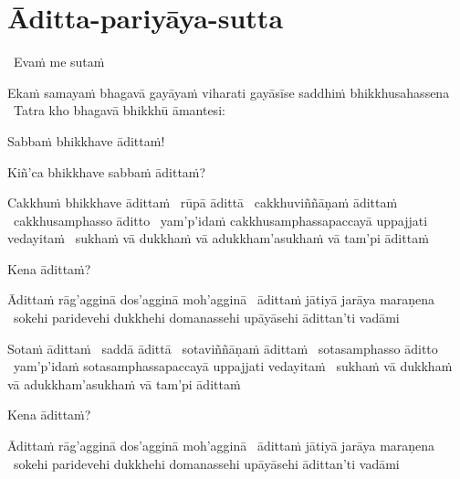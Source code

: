 \section{Āditta-pariyāya-sutta}
\label{aditta-pariyaya}

\begin{leader}
  \anglebracketleft\ \hspace{-0.5mm}Evaṁ me sutaṁ \hspace{-0.5mm}\anglebracketright\
\end{leader}

\begin{pali-hang}
  Ekaṁ samayaṁ bhagavā gayāyaṁ viharati gayāsīse saddhiṁ bhikkhusahassena \breathmark\ Tatra kho bhagavā bhikkhū āmantesi:
\end{pali-hang}

Sabbaṁ bhikkhave ādittaṁ!

Kiñ'ca bhikkhave sabbaṁ ādittaṁ?

\begin{pali-hang}
  Cakkhuṁ bhikkhave ādittaṁ \breathmark\ rūpā ādittā \breathmark\ cakkhuviññāṇaṁ ādittaṁ \breathmark\ cakkhusamphasso āditto \breathmark\ yam'p'idaṁ cakkhusamphassapaccayā uppajjati vedayitaṁ \breathmark\ sukhaṁ vā dukkhaṁ vā adukkham'asukhaṁ vā tam'pi ādittaṁ
\end{pali-hang}
\begin{pali-hangtogether}
Kena ādittaṁ?
\end{pali-hangtogether}
\begin{pali-hangtogether}
  Ādittaṁ rāg'agginā dos'agginā moh'agginā \breathmark\ ādittaṁ jātiyā jarāya maraṇena \breathmark\ sokehi paridevehi dukkhehi domanassehi upāyāsehi ādittan'ti vadāmi
\end{pali-hangtogether}

\begin{pali-hang}
  Sotaṁ ādittaṁ \breathmark\ saddā ādittā \breathmark\ sotaviññāṇaṁ ādittaṁ \breathmark\ sotasamphasso āditto \breathmark\ yam'p'idaṁ sotasamphassapaccayā uppajjati vedayitaṁ \breathmark\ sukhaṁ vā dukkhaṁ vā adukkham'asukhaṁ vā tam'pi ādittaṁ
\end{pali-hang}
\begin{pali-hangtogether}
Kena ādittaṁ?
\end{pali-hangtogether}
\begin{pali-hangtogether}
  Ādittaṁ rāg'agginā dos'agginā moh'agginā \breathmark\ ādittaṁ jātiyā jarāya maraṇena \breathmark\ sokehi paridevehi dukkhehi domanassehi upāyāsehi ādittan'ti vadāmi
\end{pali-hangtogether}

